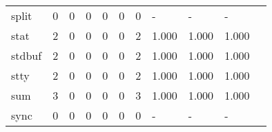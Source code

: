 \begin{longtable}{lp{1.2cm}p{1.2cm}p{1.2cm}p{1.2cm}p{1.2cm}p{1.2cm}p{1.2cm}p{1.2cm}p{1.2cm}p{1.2cm}}
split     &                                     0 &                                                  0 &                                                  0 &                                                  0 &                                                  0 &                                                  0 &                                                  - &                                                  - &                                                  - \\
stat      &                                     2 &                                                  0 &                                                  0 &                                                  0 &                                                  0 &                                                  2 &                                              1.000 &                                              1.000 &                                              1.000 \\
stdbuf    &                                     2 &                                                  0 &                                                  0 &                                                  0 &                                                  0 &                                                  2 &                                              1.000 &                                              1.000 &                                              1.000 \\
stty      &                                     2 &                                                  0 &                                                  0 &                                                  0 &                                                  0 &                                                  2 &                                              1.000 &                                              1.000 &                                              1.000 \\
sum       &                                     3 &                                                  0 &                                                  0 &                                                  0 &                                                  0 &                                                  3 &                                              1.000 &                                              1.000 &                                              1.000 \\
sync      &                                     0 &                                                  0 &                                                  0 &                                                  0 &                                                  0 &                                                  0 &                                                  - &                                                  - &                                                  - \\

\end{longtable}
